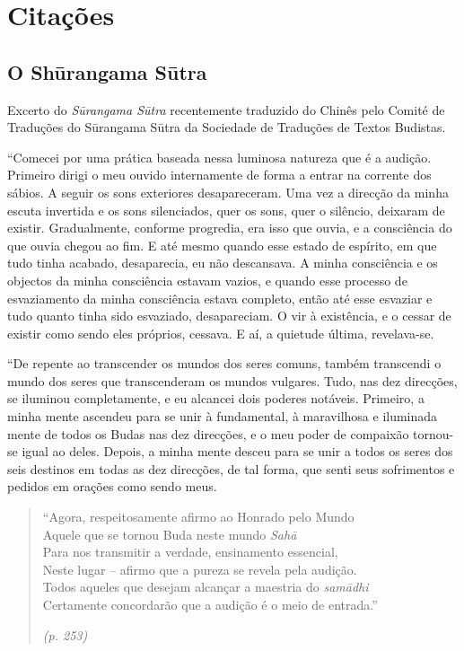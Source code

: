 \chapter{Citações}

\setlength{\parindent}{0pt}
\setlength{\parskip}{0.5\baselineskip}

\section*{O Shūrangama Sūtra}

{\small\itshape

  Excerto do \emph{Sūrangama Sūtra} recentemente traduzido do Chinês pelo Comité
  de Traduções do Sūrangama Sūtra da Sociedade de Traduções de Textos Budistas.
}

\smallskip

``Comecei por uma prática baseada nessa luminosa natureza que é a
audição. Primeiro dirigi o meu ouvido internamente de forma a entrar na
corrente dos sábios. A seguir os sons exteriores desapareceram. Uma vez
a direcção da minha escuta invertida e os sons silenciados, quer os
sons, quer o silêncio, deixaram de existir. Gradualmente, conforme
progredia, era isso que ouvia, e a consciência do que ouvia chegou ao
fim. E até mesmo quando esse estado de espírito, em que tudo tinha
acabado, desaparecia, eu não descansava. A minha consciência e os
objectos da minha consciência estavam vazios, e quando esse processo de
esvaziamento da minha consciência estava completo, então até esse
esvaziar e tudo quanto tinha sido esvaziado, desapareciam. O vir à
existência, e o cessar de existir como sendo eles próprios, cessava. E
aí, a quietude última, revelava-se.

``De repente ao transcender os mundos dos seres comuns, também
transcendi o mundo dos seres que transcenderam os mundos vulgares. Tudo,
nas dez direcções, se iluminou completamente, e eu alcancei dois poderes
notáveis. Primeiro, a minha mente ascendeu para se unir à fundamental, à
maravilhosa e iluminada mente de todos os Budas nas dez direcções, e o
meu poder de compaixão tornou-se igual ao deles. Depois, a minha mente
desceu para se unir a todos os seres dos seis destinos em todas as dez
direcções, de tal forma, que senti seus sofrimentos e pedidos em orações
como sendo meus.

\clearpage

\begin{quotation}
``Agora, respeitosamente afirmo ao Honrado pelo Mundo\\
Aquele que se tornou Buda neste mundo \emph{Sahā}\\
Para nos transmitir a verdade, ensinamento essencial,\\
Neste lugar -- afirmo que a pureza se revela pela audição.\\
Todos aqueles que desejam alcançar a maestria do \emph{samādhi}\\
Certamente concordarão que a audição é o meio de entrada.''

\emph{(p. 253)}
\end{quotation}

